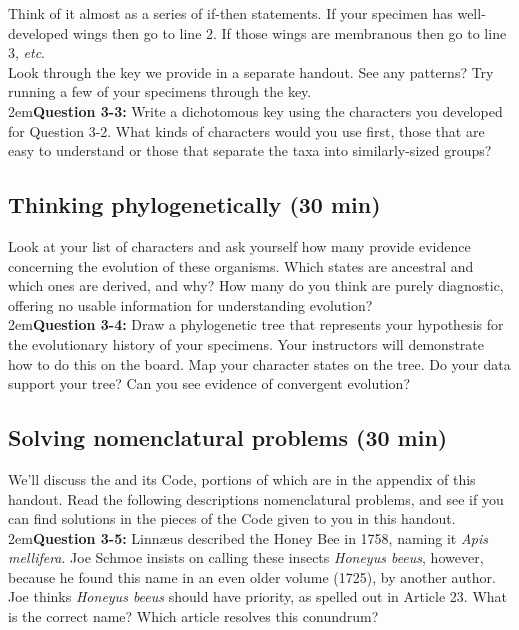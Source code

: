 \documentclass[letterpaper, 11pt]{article}
\begin{document}
\noindent{}Think of it almost as a series of if-then statements. If your specimen has well-developed wings then go to line 2. If those wings are membranous then go to line 3, \textit{etc}.\\

\noindent{}Look through the key we provide in a separate handout. See any patterns? Try running a few of your specimens through the key. \\

\hangindent2em\textbf{Question 3-3:} Write a dichotomous key using the characters you developed for Question 3-2. What kinds of characters would you use first, those that are easy to understand or those that separate the taxa into similarly-sized groups?\\

\subsection{Thinking phylogenetically (30 min)}
Look at your list of characters and ask yourself how many provide evidence concerning the evolution of these organisms. Which states are ancestral and which ones are derived, and why? How many do you think are purely diagnostic, offering no usable information for understanding evolution?\\

\hangindent2em\textbf{Question 3-4:} Draw a phylogenetic tree that represents your hypothesis for the evolutionary history of your specimens. Your instructors will demonstrate how to do this on the board. Map your character states on the tree. Do your data support your tree? Can you see evidence of convergent evolution?\\

\subsection{Solving nomenclatural problems (30 min)}

We'll discuss the \cite{iczn} and its Code, portions of which are in the appendix of this handout. Read the following descriptions nomenclatural problems, and see if you can find solutions in the pieces of the Code given to you in this handout. \\

\hangindent2em\textbf{Question 3-5:} Linn\ae{}us described the Honey Bee in 1758, naming it \textit{Apis mellifera}. Joe Schmoe insists on calling these insects \textit{Honeyus beeus}, however, because he found this name in an even older volume (1725), by another author. Joe thinks \textit{Honeyus beeus} should have priority, as spelled out in Article 23. What is the correct name? Which article resolves this conundrum?\\
\end{document}
